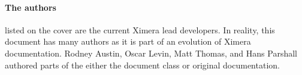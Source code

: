 \documentclass{ximera}
\begin{document}
\paragraph{The authors} listed on the cover are the current Ximera lead
developers. In reality, this document has many authors as it is part of an
evolution of Ximera documentation. Rodney Austin, Oscar Levin, Matt Thomas, and Hans
Parshall authored parts of the either the document class or original
documentation.
\end{document}
